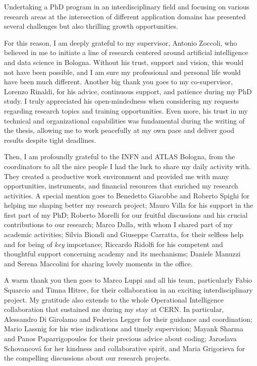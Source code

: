 \documentclass[12pt,a4paper,openright,twoside]{book}
\begin{document}
\begin{acknowledgements} %
Undertaking a PhD program in an interdisciplinary field and focusing on various research areas at the intersection of different application domains has presented several challenges but also thrilling growth opportunities.

For this reason, I am deeply grateful to my supervisor, Antonio Zoccoli, who believed in me to initiate a line of research centered around artificial intelligence and data science in Bologna. Without his trust, support and vision, this would not have been possible, and I am sure my professional and personal life would have been much different.
Another big thank you goes to my co-supervisor, Lorenzo Rinaldi, for his advice, continuous support, and patience during my PhD study. I truly appreciated his open-mindedness when considering my requests regarding research topics and training opportunities. Even more, his trust in my technical and organizational capabilities was fundamental during the writing of the thesis, allowing me to work peacefully at my own pace and deliver good results despite tight deadlines.

Then, I am profoundly grateful to the INFN and ATLAS Bologna, from the coordinators to all the nice people I had the luck to share my daily activity with. They created a productive work environment and provided me with many opportunities, instruments, and financial resources that enriched my research activities. A special mention goes to Benedetto Giacobbe and Roberto Spighi for helping me shaping better my research project; Mauro Villa for his support in the first part of my PhD; Roberto Morelli for our fruitful discussions and his crucial contributions to our research; Marco Dalla, with whom I shared part of my academic activities; Silvia Biondi and Giuseppe Carratta, for their selfless help and for being of \textit{key} importance; Riccardo Ridolfi for his competent and thoughtful support concerning academy and its mechanisms; Daniele Manuzzi and Serena Maccolini for sharing lovely moments in the office.

A warm thank you then goes to Marco Luppi and all his team, particularly Fabio Squarcio and Timna Hitrec, for their collaboration in an exciting interdisciplinary project.
My gratitude also extends to the whole Operational Intelligence collaboration that sustained me during my stay at CERN. In particular, Alessandro Di Girolamo and Federica Legger for their guidance and coordination; Mario Lassnig for his wise indications and timely supervision; Mayank Sharma and Panos Paparrigopoulos for their precious advice about coding; Jaroslava Schovancová for her kindness and collaborative spirit, and Maria Grigorieva for the compelling discussions about our research projects.


\end{acknowledgements}
\end{document}
